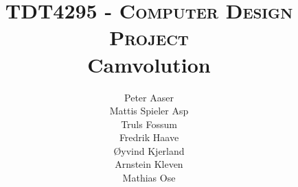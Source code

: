 
\title{
    \textsc{\Large TDT4295 - Computer Design Project}\\[0.5cm]
    {\huge \bfseries Camvolution}
}

\posttitle{
    ~\\[0.4cm]
    \HRule \\[0.4cm]
}

\author{
    Peter Aaser\\
    Mattis Spieler Asp\\
    Truls Fossum\\
    Fredrik Haave\\
    Øyvind Kjerland\\
    Arnstein Kleven\\
    Mathias Ose
}

\predate{
    \vspace{\fill}
}

\date{
    \centering{
        \large{
            \today
        }
    }
}

\maketitle

